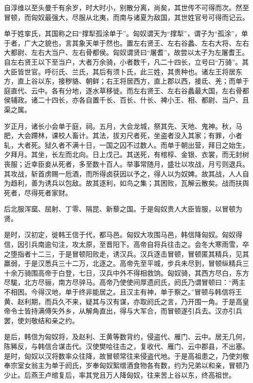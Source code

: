 \documentclass[12pt,UTF8]{ctexbook}
\begin{document}
自淳维以至头曼千有余岁，时大时小，别散分离，尚矣，其世传不可得而次。然至冒顿，而匈奴最强大，尽服从北夷，而南与诸夏为敌国，其世姓官号可得而记云。



单于姓挛氏，其国称之曰“撑犁孤涂单于”。匈奴谓天为“撑犁”，谓子为“孤涂”，单于者，广大之貌也，言其象天单于然也。置左右贤王、左右谷蠡、左右大将、左右大都尉、左右大当户、左右骨都侯。匈奴谓贤曰“屠耆”，故尝以太子为左屠耆王。自左右贤王以下至当户，大者万余骑，小者数千，凡二十四长，立号曰“万骑”。其大臣皆世官。呼衍氏、兰氏，其后有须卜氏，此三姓，其贵种也。诸左王将居东方，直上谷以东，接秽貉、朝鲜；右王将居西方，直上郡以西，接氐、羌；而单于庭直代、云中。各有分地，逐水草移徙。而左右贤王、左右谷蠡最大国，左右骨都侯辅政。诸二十四长，亦各自置千长、百长、什长、裨小王、相、都尉、当户、且渠之属。



岁正月，诸长小会单于庭，祠。五月，大会龙城，祭其先、天地、鬼神。秋，马肥，大会蹛林，课校人畜计。其法，拔刃尺者死，坐盗者没入其家；有罪，小者轧，大者死。狱久者不满十日，一国之囚不过数人。而单于朝出营，拜日之始生，夕拜月。其坐，长左而北向。日上戊己。其送死，有棺椁、金银、衣裳，而无封树丧服；近幸臣妾从死者，多至数十百人。举事常随月，盛壮以攻战，月亏则退兵。其攻战，斩首虏赐一卮酒，而所得卤获因以予之，得人以为奴婢。故其战，人人自为趋利，善为诱兵以包敌。故其逐利，如鸟之集；其困败，瓦解云散矣。战而扶舆死者，尽得死者家财。



后北服浑窳、屈射、丁零、隔昆、新藜之国。于是匈奴贵人大臣皆服，以冒顿为贤。



是时，汉初定，徙韩王信于代，都马邑。匈奴大攻围马邑，韩信降匈奴。匈奴得信，因引兵南逾句注，攻太原，至晋阳下。高帝自将兵往击之。会冬大寒雨雪，卒之堕指者十二三，于是冒顿阳败走，诱汉兵。汉兵逐击冒顿，冒顿匿其精兵，见其羸弱，于是汉悉兵三十二万，北逐之。高帝先至平城，步兵未尽到，冒顿纵精兵三十余万骑围高帝于白登，七日，汉兵中外不得相救饷。匈奴骑，其西方尽白，东方尽駹，北方尽骊，南方尽骍马。高帝乃使使间厚遗阏氏，阏氏乃谓冒顿曰：“两主不相困。今得汉地，单于终非能居之。且汉主有神，单于察之。”冒顿与韩信将王黄、赵利期，而兵久不来，疑其与汉有谋，亦取阏氏之言，乃开围一角。于是高皇帝令士皆持满傅矢外乡，从解角直出，得与大军合，而冒顿遂引兵去。汉亦引兵罢，使刘敬结和亲之约。



是后，韩信为匈奴将，及赵利、王黄等数背约，侵盗代、雁门、云中。居无几何，陈豨反，与韩信合谋击代。汉使樊哙往击之，复收代、雁门、云中郡县，不出塞。是时，匈奴以汉将数率众往降，故冒顿常往来侵盗代地。于是高祖患之，乃使刘敬奉宗室女翁主为单于阏氏，岁奉匈奴絮缯酒食物各有数，约为兄弟以和亲，冒顿乃少止。后燕王卢绾复后，率其党且万人降匈奴，往来苦上谷以东，终高祖世。
\end{document}
